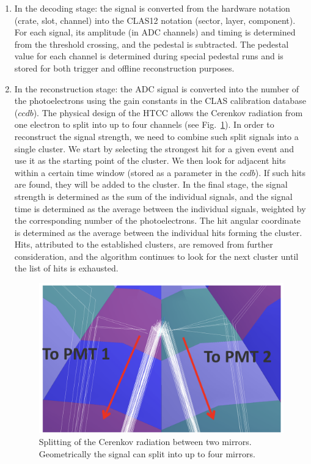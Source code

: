 \begin{enumerate}
    \item In the decoding stage: the signal is converted from the hardware notation (crate, slot, channel) into the CLAS12 notation (sector, layer, component). For each signal, its amplitude (in ADC channels) and timing is determined from the threshold crossing, and the pedestal is subtracted. The pedestal value for each channel is determined during special pedestal runs and is stored for both trigger and offline reconstruction purposes.
    \item In the reconstruction stage: the ADC signal is converted into the number of the photoelectrons using the gain constants in the CLAS calibration database ($ccdb$). The physical design of the HTCC allows the Cerenkov radiation from one electron to split into up to four channels (see Fig.~\ref{fig:htccClustersSplit}). In order to reconstruct the signal strength, we need to combine such split signals into a single cluster. We start by selecting the strongest hit for a given event and use it as the starting point of the cluster. We then look for adjacent hits within a certain time window (stored as a parameter in the $ccdb$). If such hits are found, they will be added to the cluster. In the final stage, the signal strength is determined as the sum of the individual signals, and the signal time is determined as the average between the individual signals, weighted by the corresponding number of the photoelectrons. The hit angular coordinate is determined as the average between the individual hits forming the cluster. Hits, attributed to the established clusters, are removed from further consideration, and the algorithm continues to look for the next cluster until the list of hits is exhausted.

\begin{figure}[ht]
\centering
\includegraphics[width=0.95\linewidth]{images/htccClustersSplit.png}
\caption{Splitting of the Cerenkov radiation between two mirrors. Geometrically the signal can split into up to four mirrors.}
\label{fig:htccClustersSplit}
\end{figure}
\end{enumerate}

